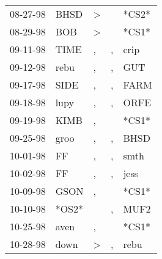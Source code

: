 \begin{supertabular}{p{0.07\textwidth}p{0.06\textwidth}p{0.02\textwidth}p{0.02\textwidth}p{0.06\textwidth}}
          08-27-98\textsuperscript{} &           BHSD\textsuperscript{} &     \textgreater &                  &                            *CS2* \\
          08-29-98\textsuperscript{} &            BOB\textsuperscript{} &     \textgreater &                  &                            *CS1* \\
          09-11-98\textsuperscript{} &           TIME\textsuperscript{} &                , &                , &           crip\textsuperscript{} \\
          09-12-98\textsuperscript{} &           rebu\textsuperscript{} &                , &                , &            GUT\textsuperscript{} \\
          09-17-98\textsuperscript{} &           SIDE\textsuperscript{} &                , &                , &           FARM\textsuperscript{} \\
          09-18-98\textsuperscript{} &           lupy\textsuperscript{} &                , &                , &           ORFE\textsuperscript{} \\
          09-19-98\textsuperscript{} &           KIMB\textsuperscript{} &                , &                  &                            *CS1* \\
          09-25-98\textsuperscript{} &           groo\textsuperscript{} &                , &                , &           BHSD\textsuperscript{} \\
          10-01-98\textsuperscript{} &             FF\textsuperscript{} &                , &                , &           smth\textsuperscript{} \\
          10-02-98\textsuperscript{} &             FF\textsuperscript{} &                , &                , &           jess\textsuperscript{} \\
          10-09-98\textsuperscript{} &           GSON\textsuperscript{} &                , &                  &                            *CS1* \\
          10-10-98\textsuperscript{} &                            *OS2* &                  &                , &           MUF2\textsuperscript{} \\
          10-25-98\textsuperscript{} &           aven\textsuperscript{} &                , &                  &                            *CS1* \\
          10-28-98\textsuperscript{} &           down\textsuperscript{} &     \textgreater &                , &           rebu\textsuperscript{} \\

\end{supertabular}
